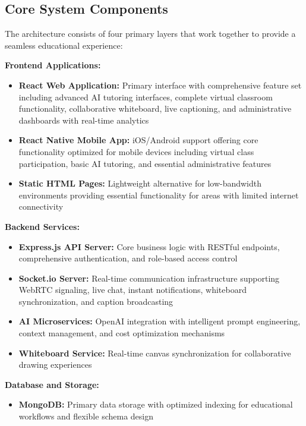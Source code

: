 \documentclass[onecolumn]{IEEEtran}
\begin{document}
\subsection{Core System Components}

The architecture consists of four primary layers that work together to provide a seamless educational experience:

\textbf{Frontend Applications:}
\begin{itemize}
\item \textbf{React Web Application:} Primary interface with comprehensive feature set including advanced AI tutoring interfaces, complete virtual classroom functionality, collaborative whiteboard, live captioning, and administrative dashboards with real-time analytics
\item \textbf{React Native Mobile App:} iOS/Android support offering core functionality optimized for mobile devices including virtual class participation, basic AI tutoring, and essential administrative features
\item \textbf{Static HTML Pages:} Lightweight alternative for low-bandwidth environments providing essential functionality for areas with limited internet connectivity
\end{itemize}

\textbf{Backend Services:}
\begin{itemize}
\item \textbf{Express.js API Server:} Core business logic with RESTful endpoints, comprehensive authentication, and role-based access control
\item \textbf{Socket.io Server:} Real-time communication infrastructure supporting WebRTC signaling, live chat, instant notifications, whiteboard synchronization, and caption broadcasting
\item \textbf{AI Microservices:} OpenAI integration with intelligent prompt engineering, context management, and cost optimization mechanisms
\item \textbf{Whiteboard Service:} Real-time canvas synchronization for collaborative drawing experiences
\end{itemize}

\textbf{Database and Storage:}
\begin{itemize}
\item \textbf{MongoDB:} Primary data storage with optimized indexing for educational workflows and flexible schema design \cite{mongodb2024}
\end{itemize}
\end{document}
